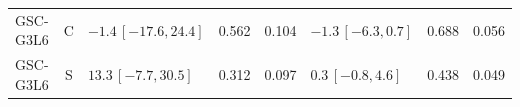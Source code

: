 \documentclass[10pt,a4paper]{article}
\begin{document}
\begin{longtable}{lcp{37mm}rrp{37mm}rr}
GSC-G3L6 & C & \(-1.4\,[-17.6,24.4]\) & 0.562 & 0.104 & \(-1.3\,[-6.3,0.7]\) & 0.688 & 0.056\\
GSC-G3L6 & S & \(13.3\,[-7.7,30.5]\) & 0.312 & 0.097 & \(0.3\,[-0.8,4.6]\) & 0.438 & 0.049\\

\end{longtable}
\end{document}
